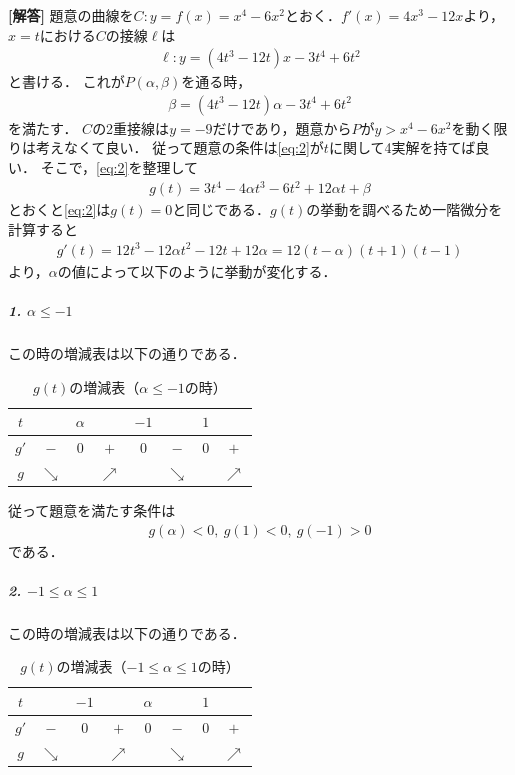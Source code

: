 \documentclass[../../main.tex]{subfiles}
\begin{document}
\begin{oframed}
  
\end{oframed}

{\bf [解答]}
題意の曲線を$C: y=f(x)=x^4-6x^2$とおく．$f'(x)=4x^3-12x$より，$x=t$における$C$の接線$\ell$は
\begin{align}
  \ell: y=(4t^3-12t)x-3t^4+6t^2 \label{eq:1}
\end{align}
と書ける．
これが$P(\alpha,\beta)$を通る時，
\begin{align}
  \beta=(4t^3-12t)\alpha-3t^4+6t^2 \label{eq:2}
\end{align}
を満たす．
$C$の2重接線は$y=-9$だけであり，題意から$P$が$y>x^4-6x^2$を動く限りは考えなくて良い．
従って題意の条件は\cref{eq:2}が$t$に関して4実解を持てば良い．
そこで，\cref{eq:2}を整理して
\begin{align}
  g(t)=3t^4-4\alpha t^3-6t^2+12\alpha t+\beta \label{eq:3}
\end{align}
とおくと\cref{eq:2}は$g(t)=0$と同じである．$g(t)$の挙動を調べるため一階微分を計算すると
\begin{align}
  g'(t)=12t^3-12\alpha t^2-12t+12\alpha=12(t-\alpha)(t+1)(t-1)
\end{align}
より，$\alpha$の値によって以下のように挙動が変化する．

\subparagraph{1. $\alpha\le-1$}

この時の増減表は以下の通りである．

\begin{table}[htb]
  \begin{center}
    \caption{$g(t)$の増減表（$\alpha\le-1$の時）}
    \begin{tabular}{c|ccccccc}
      $t$ & & $\alpha$ & & $-1$ & & $1$ & \\
      \hline
      $g'$ & $-$ & $0$ & $+$ & $0$ & $-$ & $0$ & $+$ \\
      \hline
      $g$ & $\searrow$ & & $\nearrow$ & & $\searrow$ & & $\nearrow$
    \end{tabular}
  \end{center}
\end{table}

従って題意を満たす条件は
\begin{align}
  g(\alpha)<0,\ g(1)<0,\ g(-1)>0 \label{eq:4}
\end{align}
である．

\subparagraph{2. $-1\le\alpha\le 1$}

この時の増減表は以下の通りである．

\begin{table}[htb]
  \begin{center}
    \caption{$g(t)$の増減表（$-1\le\alpha\le 1$の時）}
    \begin{tabular}{c|ccccccc}
      $t$ & & $-1$ & & $\alpha$ & & $1$ & \\
      \hline
      $g'$ & $-$ & $0$ & $+$ & $0$ & $-$ & $0$ & $+$ \\
      \hline
      $g$ & $\searrow$ & & $\nearrow$ & & $\searrow$ & & $\nearrow$
    \end{tabular}
  \end{center}
\end{table}
\end{document}
